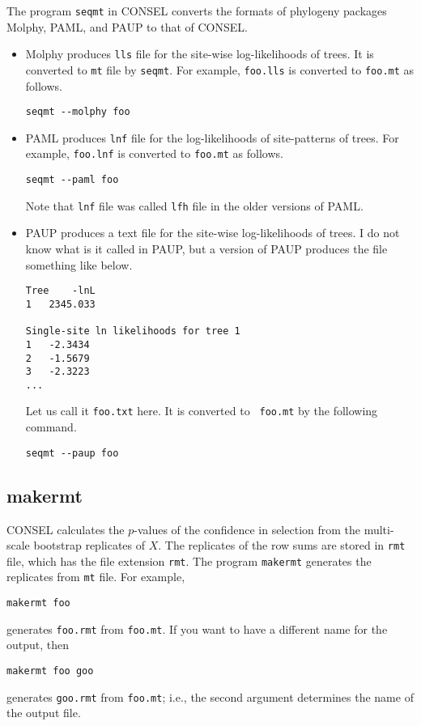 \documentclass[12pt]{article}
\begin{document}
The program {\tt seqmt} in CONSEL converts the formats of phylogeny
packages Molphy, PAML, and PAUP to that of CONSEL.
\begin{itemize}
 \item Molphy produces {\tt lls} file for the site-wise log-likelihoods
       of trees. It is converted to {\tt mt} file by {\tt seqmt}. For
       example, {\tt foo.lls} is converted to {\tt foo.mt} as follows.
\begin{verbatim}
seqmt --molphy foo
\end{verbatim}
 \item PAML produces {\tt lnf} file for the log-likelihoods of
       site-patterns of trees.  For example, {\tt foo.lnf} is converted
       to {\tt foo.mt} as follows.
\begin{verbatim}
seqmt --paml foo
\end{verbatim}
       Note that {\tt lnf} file was called {\tt lfh} file in the older
       versions of PAML.
 \item PAUP produces a text file for the site-wise log-likelihoods of
       trees. I do not know what is it called in PAUP, but a version of
       PAUP produces the file something like below.
\begin{verbatim}
Tree	-lnL
1	2345.033

Single-site ln likelihoods for tree 1
1	-2.3434
2	-1.5679
3	-2.3223
...
\end{verbatim}
       Let us call it {\tt foo.txt} here.  It is converted to {\tt
       foo.mt} by the following command.
\begin{verbatim}
seqmt --paup foo
\end{verbatim}
\end{itemize}

\subsection{makermt}

CONSEL calculates the $p$-values of the confidence in selection from the
multi-scale bootstrap replicates of $X$. The replicates of the row sums
are stored in {\tt rmt} file, which has the file extension {\tt rmt}.
The program {\tt makermt} generates the replicates from {\tt mt}
file. For example,
\begin{verbatim}
makermt foo
\end{verbatim}
generates {\tt foo.rmt} from {\tt foo.mt}.  If you want to have a
different name for the output, then 
\begin{verbatim}
makermt foo goo
\end{verbatim}
generates {\tt goo.rmt} from {\tt foo.mt}; i.e., the second argument
determines the name of the output file.
\end{document}
